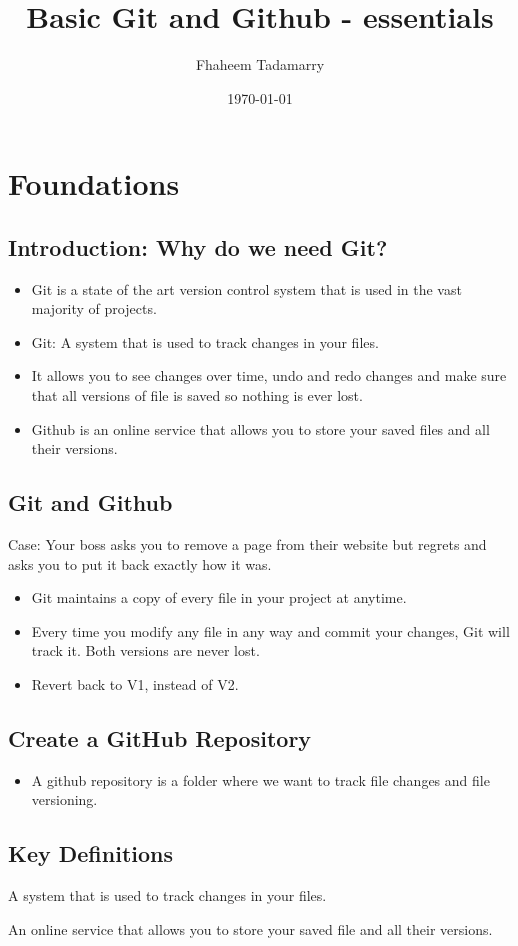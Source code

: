 \documentclass[11pt]{article}
\title{Basic Git and Github - essentials}
\author{Fhaheem Tadamarry}
\date{\today}
\begin{document}
\maketitle

\section{Foundations}
\subsection{Introduction: Why do we need Git?}
\begin{itemize}
    \item Git is a state of the art version control system that is used in the vast majority of projects.
    \item Git: A system that is used to track changes in your files. 
    \item It allows you to see changes over time, undo and redo changes and make sure that all versions of file is saved so nothing is ever lost.
    \item Github is an online service that allows you to store your saved files and all their versions.
\end{itemize}

\subsection{Git and Github}
Case: Your boss asks you to remove a page from their website but regrets and asks you to put it back exactly how it was. 
\begin{itemize}
    \item Git maintains a copy of every file in your project at anytime. 
    \item Every time you modify any file in any way and commit your changes, Git will track it. Both versions are never lost. 
    \item Revert back to V1, instead of V2.
\end{itemize}

\subsection{Create a GitHub Repository}
\begin{itemize}
    \item A github repository is a folder where we want to track file changes and file versioning. 
\end{itemize}

\subsection*{Key Definitions}
\begin{description}[leftmargin=2.5cm]
    \item[Git] A system that is used to track changes in your files.
    \item[Github] An online service that allows you to store your saved file and all their versions.
\end{description}
\end{document}
